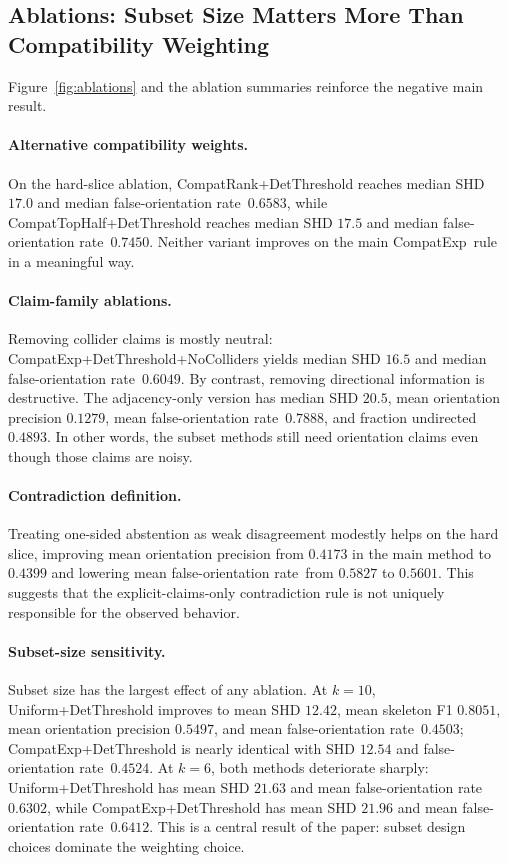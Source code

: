 \documentclass{article}
\newcommand{\method}{CompatExp}
\newcommand{\forate}{false-orientation rate}
\begin{document}
\subsection{Ablations: Subset Size Matters More Than Compatibility Weighting}

Figure~\ref{fig:ablations} and the ablation summaries reinforce the negative main result.

\paragraph{Alternative compatibility weights.}
On the hard-slice ablation, CompatRank+DetThreshold reaches median SHD $17.0$ and median \forate\ $0.6583$, while CompatTopHalf+DetThreshold reaches median SHD $17.5$ and median \forate\ $0.7450$. Neither variant improves on the main \method\ rule in a meaningful way.

\paragraph{Claim-family ablations.}
Removing collider claims is mostly neutral: CompatExp+DetThreshold+NoColliders yields median SHD $16.5$ and median \forate\ $0.6049$. By contrast, removing directional information is destructive. The adjacency-only version has median SHD $20.5$, mean orientation precision $0.1279$, mean \forate\ $0.7888$, and fraction undirected $0.4893$. In other words, the subset methods still need orientation claims even though those claims are noisy.

\paragraph{Contradiction definition.}
Treating one-sided abstention as weak disagreement modestly helps on the hard slice, improving mean orientation precision from $0.4173$ in the main method to $0.4399$ and lowering mean \forate\ from $0.5827$ to $0.5601$. This suggests that the explicit-claims-only contradiction rule is not uniquely responsible for the observed behavior.

\paragraph{Subset-size sensitivity.}
Subset size has the largest effect of any ablation. At $k=10$, Uniform+DetThreshold improves to mean SHD $12.42$, mean skeleton F1 $0.8051$, mean orientation precision $0.5497$, and mean \forate\ $0.4503$; \method+DetThreshold is nearly identical with SHD $12.54$ and \forate\ $0.4524$. At $k=6$, both methods deteriorate sharply: Uniform+DetThreshold has mean SHD $21.63$ and mean \forate\ $0.6302$, while \method+DetThreshold has mean SHD $21.96$ and mean \forate\ $0.6412$. This is a central result of the paper: subset design choices dominate the weighting choice.
\end{document}
